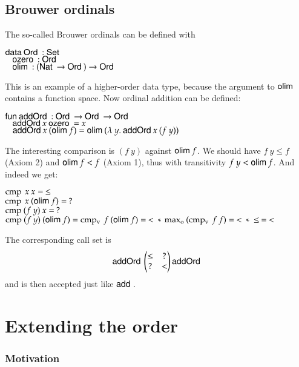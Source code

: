 \subsection{Brouwer ordinals}
The so-called Brouwer ordinals can be defined with
\begin{bsp}
$\mathsf{data}\: \mathsf{Ord}\: : \mathsf{Set}$ \\
$\hspace*{3mm} \mathsf{ozero}\: : \mathsf{Ord}\: $\\
$\hspace*{3mm} \mathsf{olim}\: : (\mathsf{Nat}\: \rightarrow \mathsf{Ord}\: ) \rightarrow \mathsf{Ord}\: $
\end{bsp}
This is an example of a higher-order data type, because the argument to $\mathsf{olim}\:$ contains a function space.
Now ordinal addition can be defined:
\begin{bsp}
$\mathsf{fun}\: \mathsf{addOrd}\: : \mathsf{Ord}\: \rightarrow \mathsf{Ord}\: \rightarrow \mathsf{Ord}\:$\\
$\hspace*{3mm} \mathsf{addOrd}\: x \: \mathsf{ozero}\: = x $\\
$\hspace*{3mm} \mathsf{addOrd}\: x \: (\mathsf{olim}\: f) = \mathsf{olim}\: ( \lambda\: y .\: \mathsf{addOrd}\:  x \: (f \: y))  $
\end{bsp}
The interesting comparison is $(f \: y)$ against $\mathsf{olim}\: f$.
We should have $f \: y \leq f$ (Axiom 2) and $\mathsf{olim}\: f < f $ (Axiom 1), thus with transitivity $ f\: y < \mathsf{olim}\: f$.
And indeed we get:
\begin{bsp}
$\operatorname{cmp} \: x \: x = \: \leq $\\
$\operatorname{cmp} \: x \: (\mathsf{olim}\: f) = \: ? $\\
$\operatorname{cmp} \: (f \: y) \: x = \: ? $\\
$\operatorname{cmp} \: (f \: y) \: (\mathsf{olim}\: f) = \operatorname{cmp_v} \: f \: (\mathsf{olim}\: f) = \: < \: * \: \operatorname{max_o} \: (\operatorname{cmp_v} \: f \: f) = \: < \: * \: \leq \: = \: < $ 
\end{bsp}
The corresponding call set is
\[
\mathsf{addOrd}\:\begin{pmatrix}
\leq & ? \\
?    & < \\
\end{pmatrix}\mathsf{addOrd}\:
\]
and is then accepted just like $\mathsf{add}\:$.
\section{Extending the order}

\subsubsection{Motivation}

